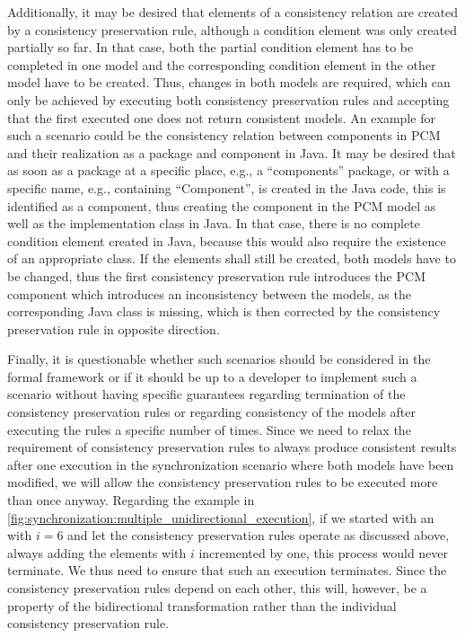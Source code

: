 Additionally, it may be desired that elements of a consistency relation are created by a consistency preservation rule, although a condition element was only created partially so far.
In that case, both the partial condition element has to be completed in one model and the corresponding condition element in the other model have to be created.
Thus, changes in both models are required, which can only be achieved by executing both consistency preservation rules and accepting that the first executed one does not return consistent models.
An example for such a scenario could be the consistency relation between components in \gls{PCM} and their realization as a package and component in Java.
It may be desired that as soon as a package at a specific place, e.g., a \enquote{components} package, or with a specific name, e.g., containing \enquote{Component}, is created in the Java code, this is identified as a component, thus creating the component in the \gls{PCM} model as well as the implementation class in Java.
In that case, there is no complete condition element created in Java, because this would also require the existence of an appropriate class.
If the elements shall still be created, both models have to be changed, thus the first consistency preservation rule introduces the \gls{PCM} component which introduces an inconsistency between the models, as the corresponding Java class is missing, which is then corrected by the consistency preservation rule in opposite direction.

Finally, it is questionable whether such scenarios should be considered in the formal framework or if it should be up to a developer to implement such a scenario without having specific guarantees regarding termination of the consistency preservation rules or regarding consistency of the models after executing the rules a specific number of times.
Since we need to relax the requirement of consistency preservation rules to always produce consistent results after one execution in the synchronization scenario where both models have been modified, we will allow the consistency preservation rules to be executed more than once anyway.
Regarding the example in \autoref{fig:synchronization:multiple_unidirectional_execution}, if we started with an  with $i = 6$ and let the consistency preservation rules operate as discussed above, always adding the elements with $i$ incremented by one, this process would never terminate.
We thus need to ensure that such an execution terminates.
Since the consistency preservation rules depend on each other, this will, however, be a property of the bidirectional transformation rather than the individual consistency preservation rule.

